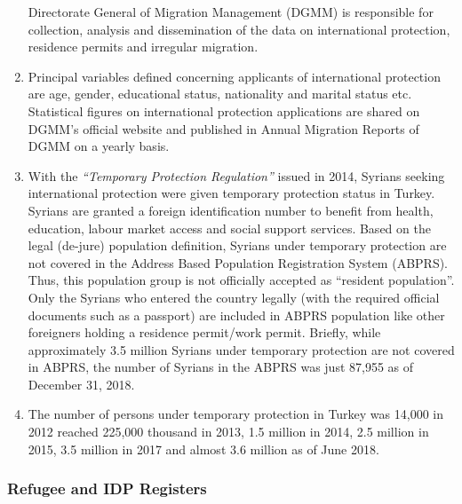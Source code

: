 \documentclass[
]{article}
\begin{document}
\begin{enumerate}
  Directorate General of Migration Management (DGMM) is responsible
  for collection, analysis and dissemination of the data on
  international protection, residence permits and irregular migration.
\item
  Principal variables defined concerning applicants of international
  protection are age, gender, educational status, nationality and
  marital status etc. Statistical figures on international protection
  applications are shared on DGMM's official website and published in
  Annual Migration Reports of DGMM on a yearly basis.
\item
  With the \emph{``Temporary Protection Regulation''} issued in 2014,
  Syrians seeking international protection were given temporary
  protection status in Turkey. Syrians are granted a foreign
  identification number to benefit from health, education, labour
  market access and social support services. Based on the legal
  (de-jure) population definition, Syrians under temporary protection
  are not covered in the Address Based Population Registration System
  (ABPRS). Thus, this population group is not officially accepted as
  ``resident population''. Only the Syrians who entered the country
  legally (with the required official documents such as a passport)
  are included in ABPRS population like other foreigners holding a
  residence permit/work permit. Briefly, while approximately 3.5
  million Syrians under temporary protection are not covered in ABPRS,
  the number of Syrians in the ABPRS was just 87,955 as of December
  31, 2018.
\item
  The number of persons under temporary protection in Turkey was
  14,000 in 2012 reached 225,000 thousand in 2013, 1.5 million in
  2014, 2.5 million in 2015, 3.5 million in 2017 and almost 3.6
  million as of June 2018.
\end{enumerate}

\hypertarget{c.2.-refugee-and-idp-registers}{%
\subsubsection{Refugee and IDP Registers}\label{c.2.-refugee-and-idp-registers}}
\end{document}
